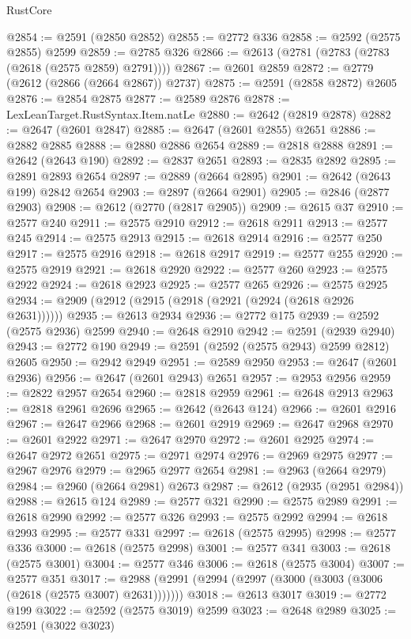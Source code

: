 \begin{lexlean}{RustCore}
\begin{coremodule}
@2854 := @2591 (@2850 @2852)
@2855 := @2772 @336
@2858 := @2592 (@2575 @2855) @2599
@2859 := @2785 @326
@2866 := @2613 (@2781 (@2783 (@2783 (@2618 (@2575 @2859) @2791))))
@2867 := @2601 @2859
@2872 := @2779 (@2612 (@2866 (@2664 @2867)) @2737)
@2875 := @2591 (@2858 @2872) @2605
@2876 := @2854 @2875
@2877 := @2589 @2876
@2878 := LexLeanTarget.RustSyntax.Item.natLe
@2880 := @2642 (@2819 @2878)
@2882 := @2647 (@2601 @2847)
@2885 := @2647 (@2601 @2855) @2651
@2886 := @2882 @2885
@2888 := @2880 @2886 @2654
@2889 := @2818 @2888
@2891 := @2642 (@2643 @190)
@2892 := @2837 @2651
@2893 := @2835 @2892
@2895 := @2891 @2893 @2654
@2897 := @2889 (@2664 @2895)
@2901 := @2642 (@2643 @199) @2842 @2654
@2903 := @2897 (@2664 @2901)
@2905 := @2846 (@2877 @2903)
@2908 := @2612 (@2770 (@2817 @2905))
@2909 := @2615 @37
@2910 := @2577 @240
@2911 := @2575 @2910
@2912 := @2618 @2911
@2913 := @2577 @245
@2914 := @2575 @2913
@2915 := @2618 @2914
@2916 := @2577 @250
@2917 := @2575 @2916
@2918 := @2618 @2917
@2919 := @2577 @255
@2920 := @2575 @2919
@2921 := @2618 @2920
@2922 := @2577 @260
@2923 := @2575 @2922
@2924 := @2618 @2923
@2925 := @2577 @265
@2926 := @2575 @2925
@2934 := @2909 (@2912 (@2915 (@2918 (@2921 (@2924 (@2618 @2926 @2631))))))
@2935 := @2613 @2934
@2936 := @2772 @175
@2939 := @2592 (@2575 @2936) @2599
@2940 := @2648 @2910
@2942 := @2591 (@2939 @2940)
@2943 := @2772 @190
@2949 := @2591 (@2592 (@2575 @2943) @2599 @2812) @2605
@2950 := @2942 @2949
@2951 := @2589 @2950
@2953 := @2647 (@2601 @2936)
@2956 := @2647 (@2601 @2943) @2651
@2957 := @2953 @2956
@2959 := @2822 @2957 @2654
@2960 := @2818 @2959
@2961 := @2648 @2913
@2963 := @2818 @2961 @2696
@2965 := @2642 (@2643 @124)
@2966 := @2601 @2916
@2967 := @2647 @2966
@2968 := @2601 @2919
@2969 := @2647 @2968
@2970 := @2601 @2922
@2971 := @2647 @2970
@2972 := @2601 @2925
@2974 := @2647 @2972 @2651
@2975 := @2971 @2974
@2976 := @2969 @2975
@2977 := @2967 @2976
@2979 := @2965 @2977 @2654
@2981 := @2963 (@2664 @2979)
@2984 := @2960 (@2664 @2981) @2673
@2987 := @2612 (@2935 (@2951 @2984))
@2988 := @2615 @124
@2989 := @2577 @321
@2990 := @2575 @2989
@2991 := @2618 @2990
@2992 := @2577 @326
@2993 := @2575 @2992
@2994 := @2618 @2993
@2995 := @2577 @331
@2997 := @2618 (@2575 @2995)
@2998 := @2577 @336
@3000 := @2618 (@2575 @2998)
@3001 := @2577 @341
@3003 := @2618 (@2575 @3001)
@3004 := @2577 @346
@3006 := @2618 (@2575 @3004)
@3007 := @2577 @351
@3017 := @2988 (@2991 (@2994 (@2997 (@3000 (@3003 (@3006 (@2618 (@2575 @3007) @2631)))))))
@3018 := @2613 @3017
@3019 := @2772 @199
@3022 := @2592 (@2575 @3019) @2599
@3023 := @2648 @2989
@3025 := @2591 (@3022 @3023)

\end{coremodule}
\end{lexlean}
